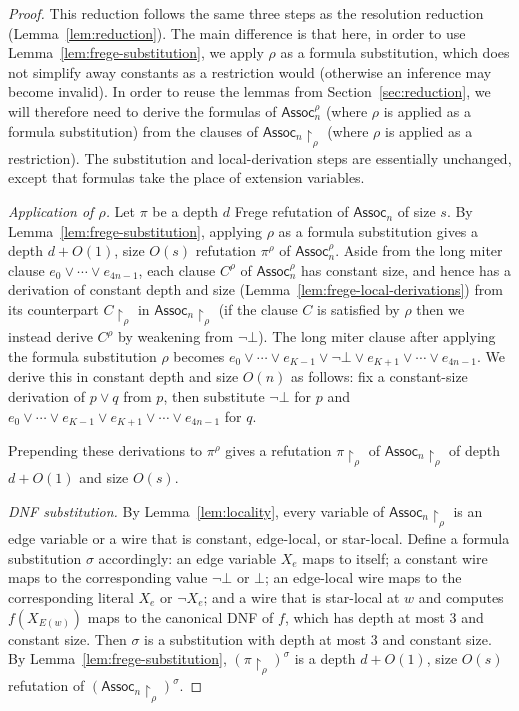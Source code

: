 \documentclass[11pt]{article}
\theoremstyle{definition}
\theoremstyle{remark}
\newcommand{\Assoc}{\mathsf{Assoc}}
\begin{document}
\begin{proof}
This reduction follows the same three steps as the resolution reduction (Lemma~\ref{lem:reduction}). The main difference is that here, in order to use Lemma~\ref{lem:frege-substitution}, we apply $\rho$ as a formula substitution, which does not simplify away constants as a restriction would (otherwise an inference may become invalid). In order to reuse the lemmas from Section~\ref{sec:reduction}, we will therefore need to derive the formulas of $\Assoc_n^\rho$ (where $\rho$ is applied as a formula substitution) from the clauses of $\Assoc_n\!\upharpoonright_\rho$ (where $\rho$ is applied as a restriction). The substitution and local-derivation steps are essentially unchanged, except that formulas take the place of extension variables.

\emph{Application of $\rho$.} 
Let $\pi$ be a depth $d$ Frege refutation of $\Assoc_n$ of size $s$. By Lemma~\ref{lem:frege-substitution}, applying $\rho$ as a formula substitution gives a depth $d+O(1)$, size $O(s)$ refutation $\pi^\rho$ of $\Assoc_n^\rho$. Aside from the long miter clause $e_0\vee\cdots\vee e_{4n-1}$, each clause $C^\rho$ of $\Assoc_n^\rho$ has constant size, and hence has a derivation of constant depth and size (Lemma~\ref{lem:frege-local-derivations}) from its counterpart $C\!\upharpoonright_\rho$ in $\Assoc_n\!\upharpoonright_\rho$ (if the clause $C$ is satisfied by $\rho$ then we instead derive $C^\rho$ by weakening from $\neg\bot$). The long miter clause after applying the formula substitution $\rho$ becomes $e_0\vee\cdots\vee e_{K-1} \vee \neg \bot \vee e_{K+1} \vee \cdots \vee e_{4n-1}$. We derive this in constant depth and size $O(n)$ as follows: fix a constant-size derivation of $p \vee q$ from $p$, then substitute $\neg \bot$ for $p$ and $e_0\vee\cdots\vee e_{K-1} \vee e_{K+1} \vee \cdots \vee e_{4n-1}$ for $q$.

Prepending these derivations to $\pi^\rho$ gives a refutation $\pi\!\upharpoonright_\rho$ of $\Assoc_n\!\upharpoonright_\rho$ of depth $d+O(1)$ and size $O(s)$.

\emph{DNF substitution.} By Lemma~\ref{lem:locality}, every variable of $\Assoc_n\!\upharpoonright_\rho$ is an edge variable or a wire that is constant, edge-local, or star-local. Define a formula substitution $\sigma$ accordingly: an edge variable $X_e$ maps to itself; a constant wire maps to the corresponding value $\neg\bot$ or $\bot$; an edge-local wire maps to the corresponding literal $X_e$ or $\neg X_e$; and a wire that is star-local at $w$ and computes $f(X_{E(w)})$ maps to the canonical DNF of $f$, which has depth at most $3$ and constant size. Then $\sigma$ is a substitution with depth at most $3$ and constant size. By Lemma~\ref{lem:frege-substitution}, $(\pi\!\upharpoonright_\rho)^\sigma$ is a depth $d+O(1)$, size $O(s)$ refutation of $(\Assoc_n\!\upharpoonright_\rho)^\sigma$.


\end{proof}
\end{document}
